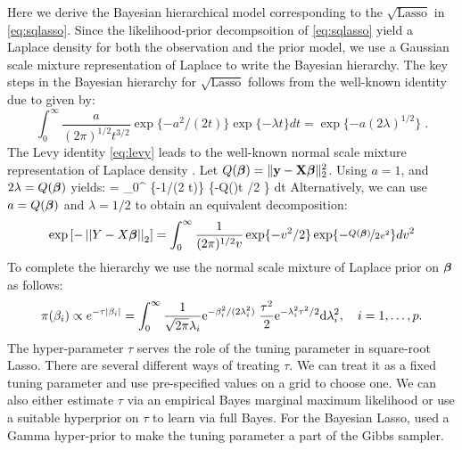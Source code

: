 \documentclass[10pt]{article}
\begin{document}
Here we derive the Bayesian hierarchical model corresponding to the $\sqrt{\text{Lasso}}$ in \eqref{eq:sqlasso}. Since the likelihood-prior decompsoition of \eqref{eq:sqlasso} yield a Laplace density for both the observation and the prior model, we use a Gaussian scale mixture representation of Laplace to write the Bayesian hierarchy. The key steps in the Bayesian hierarchy for $\sqrt{\text{Lasso}}$ follows from the well-known identity due to \citet{levy1940certains} given by:
\begin{equation}
  \int_{0}^{\infty} \frac{a}{(2 \pi)^{1/2} t^{3/2}} \exp\{-{a^2}/({2 t})\} \exp\{-\lambda t\} dt = \exp\{-a (2 \lambda)^{1/2} \} \;.\label{eq:levy}
\end{equation}
The Levy identity \eqref{eq:levy} leads to the  well-known normal scale mixture representation of Laplace density \citep{andrews_scale_1974}. Let $Q(\boldsymbol{\beta})= \lVert{\bf y} - {\bf X} \boldsymbol{\beta}\rVert_2^2$. Using $a = 1$, and $2\lambda = Q(\boldsymbol{\beta})$ yields:
\beq
\exp {} = \int_{0}^{\infty}  \exp\{-{1}/({2 t})\} \exp\{-Q(\bbeta)t /2 \} dt \label{eq:t_i}
\eeq
Alternatively, we can use $a = Q(\boldsymbol{\beta})$ and $\lambda = 1/2$ to obtain an equivalent decomposition:
\begin{equation}
\exp \left[-\left|\left|Y - X\boldsymbol{\beta}\right|\right|_2 \right] = \int_{0}^{\infty} \frac{1}{(2 \pi)^{1/2} v} \exp\{-{v^2}/{2}\} \exp\{- \nicefrac{Q(\boldsymbol{\beta})}{2v^2}\} dv^2 \label{eq:v_i}
\end{equation}
To complete the hierarchy we use the normal scale mixture of Laplace prior on $\boldsymbol{\beta}$  as follows:
\[
\pi(\beta_i) \propto e^{-\tau \lvert\beta_i\rvert} = \int_{0}^{\infty} \frac{1}{\sqrt{2\pi} \lambda_i} {\rm e}^{-\beta_i^2/(2\lambda_i^2)} \; \frac{\tau^2}{2} {\rm e}^{-\lambda_i^2\tau^2/2} {\rm d} \lambda_i^2, \quad i = 1, \ldots, p.
\]
The hyper-parameter $\tau$ serves the role of the tuning parameter in square-root Lasso. There are several different ways of treating $\tau$. We can treat it as a fixed tuning parameter and use pre-specified values on a grid to choose one.  We can also either estimate $\tau$ via an empirical Bayes marginal maximum likelihood or use a suitable hyperprior on $\tau$ to learn via full Bayes. For the Bayesian Lasso, \cite{park_bayesian_2008} used a Gamma hyper-prior to make the tuning parameter a part of the Gibbs sampler. 
\end{document}
